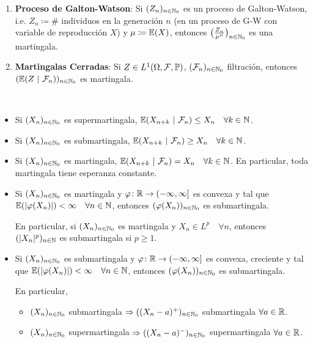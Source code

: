 \begin{eg}
\begin{enumerate}
		\item \textbf{Proceso de Galton-Watson}: Si $(Z_{n})_{n \in \mathbb{N}_{0}}$ es un proceso de Galton-Watson, i.e. $Z_{n} \coloneq \#$ individuos en la generación $n$ (en un proceso de G-W con variable de reproducción $X$) y $\mu \coloneq \mathbb{E}(X)$, entonces $\big( \frac{Z_{n}}{\mu^{n}} \big)_{n \in \mathbb{N}_{0}}$ es una martingala.

		\item \textbf{Martingalas Cerradas}: Si $Z \in L^{1}(\Omega, \mathcal{F}, \mathbb{P})$, $(\mathcal{F}_{n})_{n \in \mathbb{N}_{0}}$ filtración, entonces $(\mbb{E}(Z \ | \ \mcal{F}_{n}))_{n \in \N_{0}}$ es martingala.
	\end{enumerate}
\end{eg}

\begin{property}~
	\begin{itemize}
		\item Si $(X_{n})_{n \in \mathbb{N}_{0}}$ es supermartingala, $\mbb{E}(X_{n + k} \ | \ \mcal{F}_{n}) \leq X_{n} \quad \forall k \in \N$.

		\item Si $(X_{n})_{n \in \mathbb{N}_{0}}$ es submartingala, $\mbb{E}(X_{n + k} \ | \ \mcal{F}_{n}) \geq X_{n} \quad \forall k \in \N$.

		\item Si $(X_{n})_{n \in \mathbb{N}_{0}}$ es martingala, $\mbb{E}(X_{n + k} \ | \ \mcal{F}_{n}) = X_{n} \quad \forall k \in \N$. En particular, toda martingala tiene esperanza constante.

		\item Si $(X_{n})_{n \in \mathbb{N}_{0}}$ es martingala y $\varphi \colon \mathbb{R} \to (-\infty,\infty]$ es convexa y tal que $\mathbb{E}(|\varphi(X_{n})|) < \infty \quad \forall n \in \mathbb{N}$, entonces $(\varphi(X_{n}))_{n \in \mathbb{N}_{0}}$ es submartingala. \par
		En particular, si $(X_{n})_{n \in \mathbb{N}_{0}}$ es martingala y $X_{n} \in L^{p} \quad \forall n$, entonces $(|X_{n}|^{p})_{n \in \mathbb{N}}$ es submartingala si $p \geq 1$.

		\item Si $(X_{n})_{n \in \mathbb{N}_{0}}$ es submartingala y $\varphi \colon \mathbb{R} \to (-\infty,\infty]$ es convexa, creciente y tal que $\mathbb{E}(|\varphi(X_{n})|) < \infty \quad \forall n \in \mathbb{N}$, entonces $(\varphi(X_{n}))_{n \in \mathbb{N}_{0}}$ es submartingala. \par 
		En particular,
		\begin{itemize}
			\item $(X_{n})_{n \in \mathbb{N}_{0}}$ submartingala $\Rightarrow ((X_{n} - a)^{+})_{n \in \mathbb{N}_{0}}$ submartingala $\forall a \in \mathbb{R}$.

			\item $(X_{n})_{n \in \mathbb{N}_{0}}$ supermartingala $\Rightarrow ((X_{n} - a)^{-})_{n \in \mathbb{N}_{0}}$ supermartingala $\forall a \in \mathbb{R}$.
		\end{itemize}
	\end{itemize}
\end{property}

